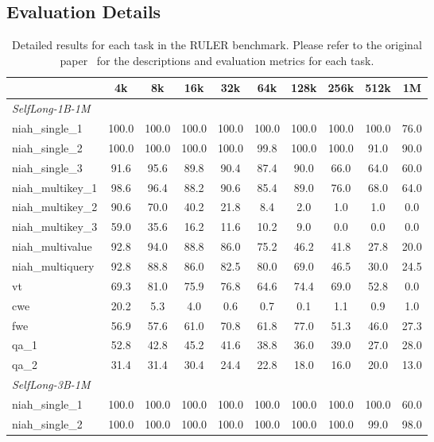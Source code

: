 \documentclass{article}
\begin{document}
\subsection{Evaluation Details}
\begin{table}[ht]
\centering
\caption{Detailed results for each task in the RULER benchmark.
Please refer to the original paper~\citep{hsieh2024ruler} for the descriptions and evaluation metrics for each task.}
\begin{tabular}{lccccccccc}
\hline
 & 4k & 8k & 16k & 32k & 64k & 128k & 256k & 512k & 1M \\ \hline
\multicolumn{10}{l}{\emph{SelfLong-1B-1M}}                                \\ \hline
niah\_single\_1 & 100.0 & 100.0 & 100.0 & 100.0 & 100.0 & 100.0 & 100.0 & 100.0 & 76.0 \\
niah\_single\_2 & 100.0 & 100.0 & 100.0 & 100.0 & 99.8 & 100.0 & 100.0 & 91.0 & 90.0 \\
niah\_single\_3 & 91.6 & 95.6 & 89.8 & 90.4 & 87.4 & 90.0 & 66.0 & 64.0 & 60.0 \\
niah\_multikey\_1 & 98.6 & 96.4 & 88.2 & 90.6 & 85.4 & 89.0 & 76.0 & 68.0 & 64.0 \\
niah\_multikey\_2 & 90.6 & 70.0 & 40.2 & 21.8 & 8.4 & 2.0 & 1.0 & 1.0 & 0.0 \\
niah\_multikey\_3 & 59.0 & 35.6 & 16.2 & 11.6 & 10.2 & 9.0 & 0.0 & 0.0 & 0.0 \\
niah\_multivalue & 92.8 & 94.0 & 88.8 & 86.0 & 75.2 & 46.2 & 41.8 & 27.8 & 20.0 \\
niah\_multiquery & 92.8 & 88.8 & 86.0 & 82.5 & 80.0 & 69.0 & 46.5 & 30.0 & 24.5 \\
vt & 69.3 & 81.0 & 75.9 & 76.8 & 64.6 & 74.4 & 69.0 & 52.8 & 0.0 \\
cwe & 20.2 & 5.3 & 4.0 & 0.6 & 0.7 & 0.1 & 1.1 & 0.9 & 1.0 \\
fwe & 56.9 & 57.6 & 61.0 & 70.8 & 61.8 & 77.0 & 51.3 & 46.0 & 27.3 \\
qa\_1 & 52.8 & 42.8 & 45.2 & 41.6 & 38.8 & 36.0 & 39.0 & 27.0 & 28.0 \\
qa\_2 & 31.4 & 31.4 & 30.4 & 24.4 & 22.8 & 18.0 & 16.0 & 20.0 & 13.0 \\ \hline
\multicolumn{10}{l}{\emph{SelfLong-3B-1M}}                                \\ \hline
niah\_single\_1 & 100.0 & 100.0 & 100.0 & 100.0 & 100.0 & 100.0 & 100.0 & 100.0 & 60.0 \\
niah\_single\_2 & 100.0 & 100.0 & 100.0 & 100.0 & 100.0 & 100.0 & 100.0 & 99.0 & 98.0 \\

\end{tabular}
\end{table}
\end{document}
